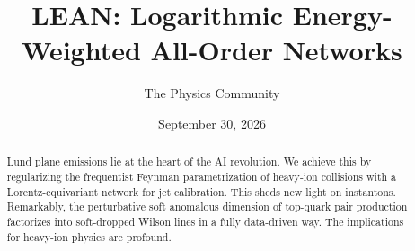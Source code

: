 \documentclass[11pt]{article}
\title{LEAN: Logarithmic Energy-Weighted All-Order Networks}
\author{The Physics Community}
\date{September 30, 2026}
\numberwithin{equation}{section}
\theoremstyle{definition}
\theoremstyle{remark}
\begin{document}
\maketitle
\begin{abstract}
Lund plane emissions lie at the heart of the AI revolution. We achieve
this by regularizing the frequentist Feynman parametrization of
heavy-ion collisions with a Lorentz-equivariant network for jet
calibration. This sheds new light on instantons. Remarkably, the
perturbative soft anomalous dimension of top-quark pair production
factorizes into soft-dropped Wilson lines in a fully data-driven way.
The implications for heavy-ion physics are profound.
\end{abstract}
\tableofcontents






\nocite{*}


\end{document}
